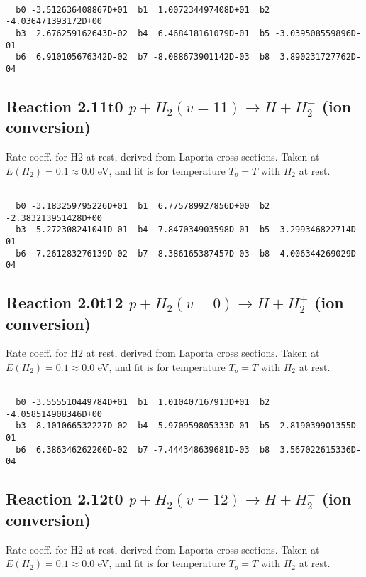 \begin{small}\begin{verbatim}

  b0 -3.512636408867D+01  b1  1.007234497408D+01  b2 -4.036471393172D+00
  b3  2.676259162643D-02  b4  6.468418161079D-01  b5 -3.039508559896D-01
  b6  6.910105676342D-02  b7 -8.088673901142D-03  b8  3.890231727762D-04

\end{verbatim}\end{small}

\newpage
\subsection{
Reaction 2.11t0
$ p + H_2(v=11) \rightarrow H + H_2^+$ (ion conversion)
}
Rate coeff. for H2 at rest, derived from Laporta cross sections.
Taken at $E(H_2) = 0.1 \approx 0.0$ eV,  and fit is for temperature $T_p=T$ with $H_2$ at rest.

\begin{small}\begin{verbatim}

  b0 -3.183259795226D+01  b1  6.775789927856D+00  b2 -2.383213951428D+00
  b3 -5.272308241041D-01  b4  7.847034903598D-01  b5 -3.299346822714D-01
  b6  7.261283276139D-02  b7 -8.386165387457D-03  b8  4.006344269029D-04

\end{verbatim}\end{small}

\newpage
\subsection{
Reaction 2.0t12
$ p + H_2(v=0) \rightarrow H + H_2^+$ (ion conversion)
}
Rate coeff. for H2 at rest, derived from Laporta cross sections.
Taken at $E(H_2) = 0.1 \approx 0.0$ eV,  and fit is for temperature $T_p=T$ with $H_2$ at rest.

\begin{small}\begin{verbatim}

  b0 -3.555510449784D+01  b1  1.010407167913D+01  b2 -4.058514908346D+00
  b3  8.101066532227D-02  b4  5.970959805333D-01  b5 -2.819039901355D-01
  b6  6.386346262200D-02  b7 -7.444348639681D-03  b8  3.567022615336D-04

\end{verbatim}\end{small}

\newpage
\subsection{
Reaction 2.12t0
$ p + H_2(v=12) \rightarrow H + H_2^+$ (ion conversion)
}
Rate coeff. for H2 at rest, derived from Laporta cross sections.
Taken at $E(H_2) = 0.1 \approx 0.0$ eV,  and fit is for temperature $T_p=T$ with $H_2$ at rest.

